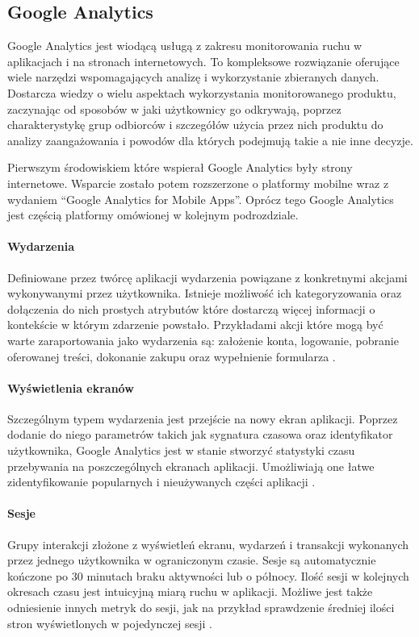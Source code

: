 \subsection{Google Analytics}
\label{sec:ga}
Google Analytics jest wiodącą usługą z zakresu monitorowania ruchu w aplikacjach i na stronach internetowych. To kompleksowe rozwiązanie oferujące wiele narzędzi wspomagających analizę i wykorzystanie zbieranych danych. Dostarcza wiedzy o wielu aspektach wykorzystania monitorowanego produktu, zaczynając od sposobów w jaki użytkownicy go odkrywają, poprzez charakterystykę grup odbiorców i szczegółów użycia przez nich produktu do analizy zaangażowania i powodów dla których podejmują takie a nie inne decyzje.

Pierwszym środowiskiem które wspierał Google Analytics były strony internetowe. Wsparcie zostało potem rozszerzone o platformy mobilne wraz z wydaniem ``Google Analytics for Mobile Apps''. Oprócz tego Google Analytics jest częścią platformy  omówionej w kolejnym podrozdziale.


\paragraph{Wydarzenia}
\label{par:ga-events}
Definiowane przez twórcę aplikacji wydarzenia powiązane z konkretnymi akcjami wykonywanymi przez użytkownika. Istnieje możliwość ich kategoryzowania oraz dołączenia do nich prostych atrybutów które dostarczą więcej informacji o kontekście w którym zdarzenie powstało. Przykładami akcji które mogą być warte zaraportowania jako wydarzenia są: założenie konta, logowanie, pobranie oferowanej treści, dokonanie zakupu oraz wypełnienie formularza \cite{GA_Events}.

\paragraph{Wyświetlenia ekranów}
Szczególnym typem wydarzenia jest przejście na nowy ekran aplikacji. Poprzez dodanie do niego parametrów takich jak sygnatura czasowa oraz identyfikator użytkownika, Google Analytics jest w stanie stworzyć statystyki czasu przebywania na poszczególnych ekranach aplikacji. Umożliwiają one łatwe zidentyfikowanie popularnych i nieużywanych części aplikacji \cite{GA_Pages}.

\paragraph{Sesje}
Grupy interakcji złożone z wyświetleń ekranu, wydarzeń i transakcji wykonanych przez jednego użytkownika w ograniczonym czasie. Sesje są automatycznie kończone po 30 minutach braku aktywności lub o północy. Ilość sesji w kolejnych okresach czasu jest intuicyjną miarą ruchu w aplikacji. Możliwe jest także odniesienie innych metryk do sesji, jak na przykład sprawdzenie średniej ilości stron wyświetlonych w pojedynczej sesji \cite{GA_Sessions}.

